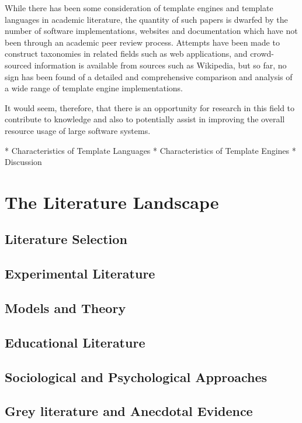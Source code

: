 While there has been some consideration of template engines and template languages in academic literature, the quantity of such papers is dwarfed by the number of software implementations, websites and documentation which have not been through an academic peer review process. Attempts have been made to construct taxonomies in related fields such as web applications, and crowd-sourced information is available from sources such as Wikipedia, but so far, no sign has been found of a detailed and comprehensive comparison and analysis of a wide range of template engine implementations.

It would seem, therefore, that there is an opportunity for research in this field to contribute to knowledge and also to potentially assist in improving the overall resource usage of large software systems.

            * Characteristics of Template Languages
            * Characteristics of Template Engines
            * Discussion

\section{The Literature Landscape}
\label{section:template literature landscape}


\subsection{Literature Selection}

\subsection{Experimental Literature}

\subsection{Models and Theory}

\subsection{Educational Literature}

\subsection{Sociological and Psychological Approaches}

\subsection{Grey literature and Anecdotal Evidence}

